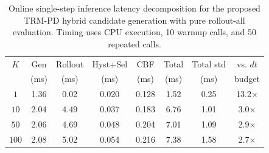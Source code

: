 \begin{table}[t]
\centering
\caption{Online single-step inference latency decomposition for the proposed TRM-PD hybrid candidate generation with pure rollout-all evaluation. Timing uses CPU execution, 10 warmup calls, and 50 repeated calls.}
\label{tab:latency}
\begin{tabular}{cccccccc}
\toprule
$K$ & Gen & Rollout & Hyst+Sel & CBF & Total & Total std & vs. $dt$ \\
& (ms) & (ms) & (ms) & (ms) & (ms) & (ms) & budget \\
\midrule
  $1$ & 1.36 & 0.02 & 0.020 & 0.128 & 1.52 & 0.25 & 13.2$\times$ \\
  $10$ & 2.04 & 4.49 & 0.037 & 0.183 & 6.76 & 1.01 & 3.0$\times$ \\
  $50$ & 2.06 & 4.69 & 0.048 & 0.204 & 7.01 & 1.09 & 2.9$\times$ \\
  $100$ & 2.08 & 5.02 & 0.054 & 0.216 & 7.38 & 1.58 & 2.7$\times$ \\
\bottomrule
\end{tabular}
\end{table}
